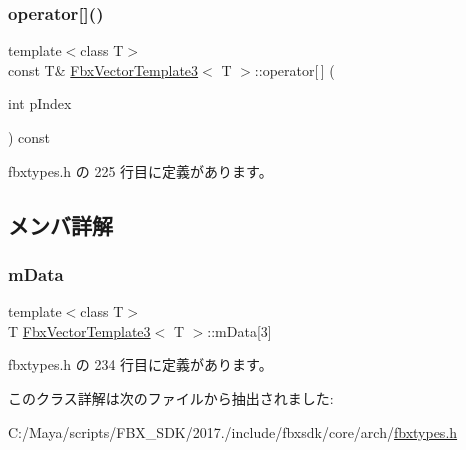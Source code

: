 \subsubsection{\texorpdfstring{operator[]()}{operator[]()}\hspace{0.1cm}{\footnotesize\ttfamily [2/2]}}
{\footnotesize\ttfamily template$<$class T$>$ \\
const T\& \hyperlink{class_fbx_vector_template3}{Fbx\+Vector\+Template3}$<$ T $>$\+::operator\mbox{[}$\,$\mbox{]} (\begin{DoxyParamCaption}\item[{int}]{p\+Index }\end{DoxyParamCaption}) const\hspace{0.3cm}{\ttfamily [inline]}}



 fbxtypes.\+h の 225 行目に定義があります。



\subsection{メンバ詳解}
\mbox{\label{class_fbx_vector_template3_a63f8316f392b536de41dfaa2031a2d54}} 
\subsubsection{\texorpdfstring{m\+Data}{mData}}
{\footnotesize\ttfamily template$<$class T$>$ \\
T \hyperlink{class_fbx_vector_template3}{Fbx\+Vector\+Template3}$<$ T $>$\+::m\+Data\mbox{[}3\mbox{]}}



 fbxtypes.\+h の 234 行目に定義があります。



このクラス詳解は次のファイルから抽出されました\+:\begin{DoxyCompactItemize}
\item 
C\+:/\+Maya/scripts/\+F\+B\+X\+\_\+\+S\+D\+K/2017./include/fbxsdk/core/arch/\hyperlink{fbxtypes_8h}{fbxtypes.\+h}\end{DoxyCompactItemize}
